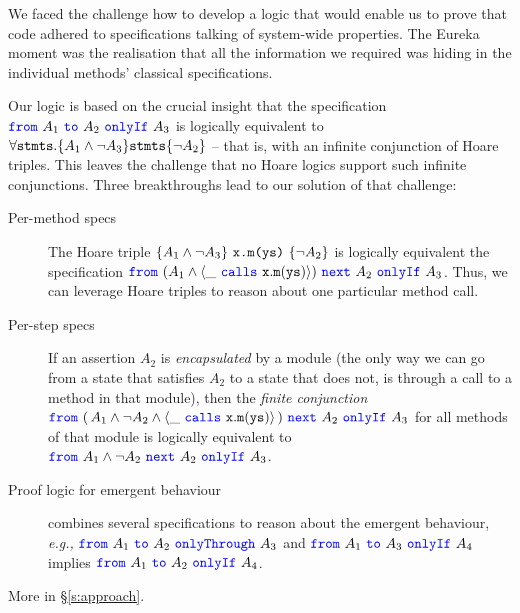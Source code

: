 We faced the challenge  how to develop a logic that would enable us to prove that code 
 adhered to  specifications {talking of system-wide properties.} The Eureka moment was the realisation that all the information we required was hiding  { in the individual methods' classical specifications.}
%

 {Our logic %
 is based on the crucial insight that the specification ${\color{blue}\texttt{from}}\ A_1\ {\color{blue}\texttt{to}}\ A_2\ {\color{blue}\texttt{onlyIf}}\ A_3$ is 
logically equivalent
{to}
 $\forall {\texttt{stmts}}. \{ A_1 \wedge \neg A_3\} {\texttt{stmts}} \{ \neg A_2 \}$ -- that is,
 with an infinite conjunction  of Hoare triples.}
 {This leaves the challenge that no Hoare logics support such infinite conjunctions.
 Three breakthroughs lead to our solution of that challenge:}
 \begin{description}
 \item
 [Per-method specs] 
  The Hoare triple 
$ \{ A_1 \wedge \neg A_3 \} \ {\texttt{x.m(ys)}}\  \{ \neg A_2 \}$ is logically equivalent 
the specification
$ {\color{blue}\texttt{from}}\ (A_1 \wedge {\langle \_\ {\color{blue}\texttt{calls}}\ {\texttt{x}}.{\texttt{m}}({\texttt{ys}}) \rangle } )\ {\color{blue}\texttt{next}}\ A_2\ {\color{blue}\texttt{onlyIf}}\ A_3$. %
Thus, we can  leverage Hoare triples to reason about one particular method call.  
 
 \item 
 [Per-step specs] %
 If an assertion $A_2$  is \emph{encapsulated} by a module (\ie the only way we can go from a 
 state that satisfies $A_2$ to a state that does not, is through a call to a method in that module), then
{the
\emph{finite conjunction}
 $ {\color{blue}\texttt{from}}\ (\, A_1 \wedge \neg A_2 \wedge {\langle \_\ {\color{blue}\texttt{calls}}\ {\texttt{x}}.{\texttt{m}}({\texttt{ys}}) \rangle}\, )\ {\color{blue}\texttt{next}}\ A_2\ {\color{blue}\texttt{onlyIf}}\ A_3$
 for all methods of that module is logically equivalent 
 {to}
 $ {\color{blue}\texttt{from}}\ A_1 \wedge \neg A_2\ {\color{blue}\texttt{next}}\  A_2\ {\color{blue}\texttt{onlyIf}}\ A_3$. }
  \item [Proof logic  for emergent behaviour] %
  combines several specifications to reason about the
  emergent behaviour, \emph{e.g.,} 
   $ {\color{blue}\texttt{from}}\ A_1\ {\color{blue}\texttt{to}}\ A_2\ {\color{blue}\texttt{onlyThrough}}\ A_3$  and $ {\color{blue}\texttt{from}}\ A_1\ {\color{blue}\texttt{to}}\ A_3\ {\color{blue}\texttt{onlyIf}}\ A_4$ implies 
   $ {\color{blue}\texttt{from}}\ A_1\ {\color{blue}\texttt{to}}\ A_2\ {\color{blue}\texttt{onlyIf}}\ A_4$.
 \end{description}
More in \S\ref{s:approach}.
 

